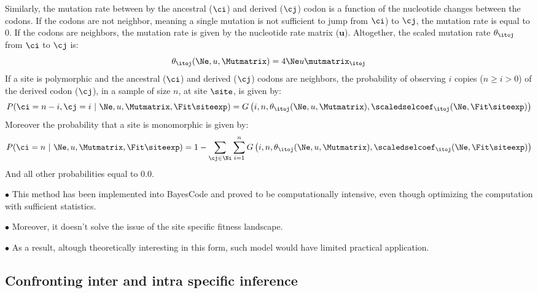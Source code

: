 Similarly, the mutation rate between by the ancestral ($\ci$) and derived ($\cj$) \gls{codon} is a function of the nucleotide changes between the \glspl{codon}. If the \glspl{codon} are not neighbor, meaning a single mutation is not sufficient to jump from $\ci$) to $\cj$, the mutation rate is equal to $0$. If the \glspl{codon} are neighbors, the mutation rate is given by the nucleotide rate matrix ($ \bm{u} $). Altogether, the scaled mutation rate $\theta_{\itoj}$ from $\ci$ to $\cj$ is:
\begin{equation}
	\theta_{\itoj}(\Ne, u, \Mutmatrix) = 4 \Ne u \mutmatrix_{\itoj}
\end{equation}
If a site is \gls{polymorphic} and the ancestral ($\ci$) and derived ($\cj$) \glspl{codon} are neighbors, the probability of observing $i$ copies ($n \geq i > 0$) of the derived \gls{codon} ($\cj$), in a sample of size $n$, at site $\site$, is given by:
\begin{equation}
	P(\ci=n-i,\cj=i \ |\ \Ne, u, \Mutmatrix, \Fit\siteexp) = G\left(i, n, \theta_{\itoj}(\Ne, u, \Mutmatrix), \scaledselcoef_{\itoj}(\Ne, \Fit\siteexp) \right)
\end{equation}
Moreover the probability that a site is monomorphic is given by:
\begin{equation}
	P(\ci= n \ |\ \Ne, u, \Mutmatrix, \Fit\siteexp) = 1 - \sum\limits_{\cj \in \Ni} \sum\limits_{i=1}^{n} G\left(i, n, \theta_{\itoj}(\Ne, u, \Mutmatrix), \scaledselcoef_{\itoj}(\Ne, \Fit\siteexp)\right)
\end{equation}
And all other probabilities equal to $0.0$.

$\bullet$ This method has been implemented into BayesCode and proved to be computationally intensive, even though optimizing the computation with sufficient statistics.

$\bullet$ Moreover, it doesn't solve the issue of the site specific fitness landscape.

$\bullet$ As a result, altough theoretically interesting in this form, such model would have limited practical application.

\subsection{Confronting inter and intra specific inference}

